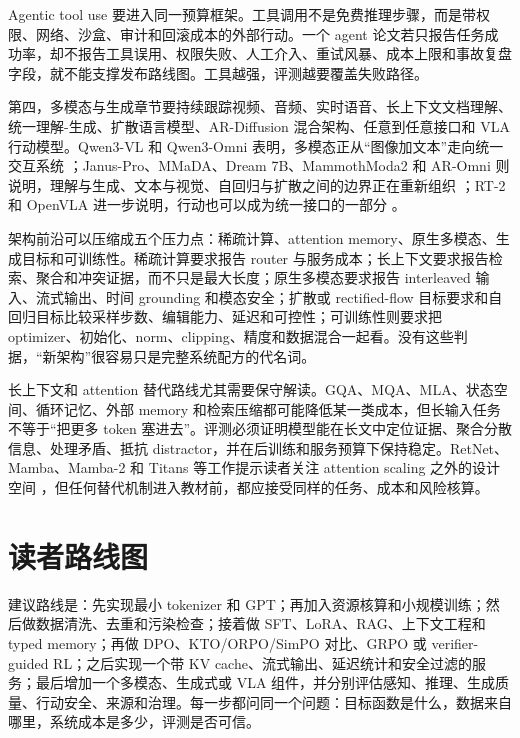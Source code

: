 \documentclass[UTF8,zihao=-4,openany]{ctexbook}
\begin{document}
Agentic tool use 要进入同一预算框架。工具调用不是免费推理步骤，而是带权限、网络、沙盒、审计和回滚成本的外部行动。一个 agent 论文若只报告任务成功率，却不报告工具误用、权限失败、人工介入、重试风暴、成本上限和事故复盘字段，就不能支撑发布路线图。工具越强，评测越要覆盖失败路径。

第四，多模态与生成章节要持续跟踪视频、音频、实时语音、长上下文文档理解、统一理解-生成、扩散语言模型、AR-Diffusion 混合架构、任意到任意接口和 VLA 行动模型。Qwen3-VL 和 Qwen3-Omni 表明，多模态正从“图像加文本”走向统一交互系统 \cite{qwen2025qwen3vl,qwen2025qwen3omni}；Janus-Pro、MMaDA、Dream 7B、MammothModa2 和 AR-Omni 则说明，理解与生成、文本与视觉、自回归与扩散之间的边界正在重新组织 \cite{chen2025januspro,yang2025mmada,ye2025dream7b,shen2025mammothmoda2,cheng2026aromni}；RT-2 和 OpenVLA 进一步说明，行动也可以成为统一接口的一部分 \cite{brohan2023rt2,kim2024openvla}。

架构前沿可以压缩成五个压力点：稀疏计算、attention memory、原生多模态、生成目标和可训练性。稀疏计算要求报告 router 与服务成本；长上下文要求报告检索、聚合和冲突证据，而不只是最大长度；原生多模态要求报告 interleaved 输入、流式输出、时间 grounding 和模态安全；扩散或 rectified-flow 目标要求和自回归目标比较采样步数、编辑能力、延迟和可控性；可训练性则要求把 optimizer、初始化、norm、clipping、精度和数据混合一起看。没有这些判据，“新架构”很容易只是完整系统配方的代名词。

长上下文和 attention 替代路线尤其需要保守解读。GQA、MQA、MLA、状态空间、循环记忆、外部 memory 和检索压缩都可能降低某一类成本，但长输入任务不等于“把更多 token 塞进去”。评测必须证明模型能在长文中定位证据、聚合分散信息、处理矛盾、抵抗 distractor，并在后训练和服务预算下保持稳定。RetNet、Mamba、Mamba-2 和 Titans 等工作提示读者关注 attention scaling 之外的设计空间 \cite{sun2023retnet,gu2023mamba,dao2024mamba2,behrouz2025titans}，但任何替代机制进入教材前，都应接受同样的任务、成本和风险核算。

\section{读者路线图}
建议路线是：先实现最小 tokenizer 和 GPT；再加入资源核算和小规模训练；然后做数据清洗、去重和污染检查；接着做 SFT、LoRA、RAG、上下文工程和 typed memory；再做 DPO、KTO/ORPO/SimPO 对比、GRPO 或 verifier-guided RL；之后实现一个带 KV cache、流式输出、延迟统计和安全过滤的服务；最后增加一个多模态、生成式或 VLA 组件，并分别评估感知、推理、生成质量、行动安全、来源和治理。每一步都问同一个问题：目标函数是什么，数据来自哪里，系统成本是多少，评测是否可信。
\end{document}
